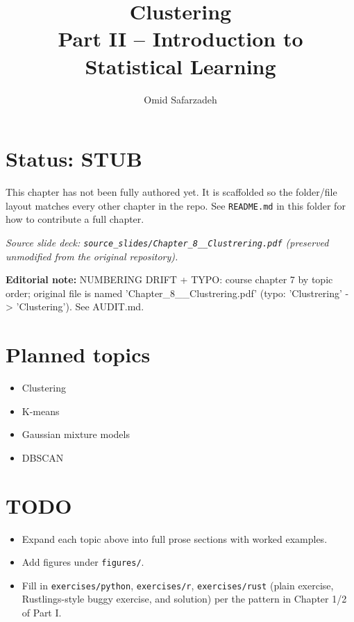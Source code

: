 \documentclass[11pt]{article}
\title{Clustering \\ \large Part II -- Introduction to Statistical Learning}
\author{Omid Safarzadeh}
\date{}
\begin{document}
\maketitle

\section*{Status: STUB}
This chapter has not been fully authored yet. It is scaffolded so the
folder/file layout matches every other chapter in the repo. See
\texttt{README.md} in this folder for how to contribute a full chapter.

\textit{Source slide deck: \texttt{source\_slides/Chapter\_8\_\_Clustrering.pdf} (preserved unmodified from the original repository).}

\par\noindent\textbf{Editorial note:} NUMBERING DRIFT + TYPO: course chapter 7 by topic order; original file is named 'Chapter\_8\_\_Clustrering.pdf' (typo: 'Clustrering' -> 'Clustering'). See AUDIT.md.

\section*{Planned topics}
\begin{itemize}
  \item Clustering
  \item K-means
  \item Gaussian mixture models
  \item DBSCAN
\end{itemize}

\section*{TODO}
\begin{itemize}
  \item Expand each topic above into full prose sections with worked examples.
  \item Add figures under \texttt{figures/}.
  \item Fill in \texttt{exercises/python}, \texttt{exercises/r}, \texttt{exercises/rust}
        (plain exercise, Rustlings-style buggy exercise, and solution) per the
        pattern in Chapter 1/2 of Part I.
\end{itemize}
\end{document}
